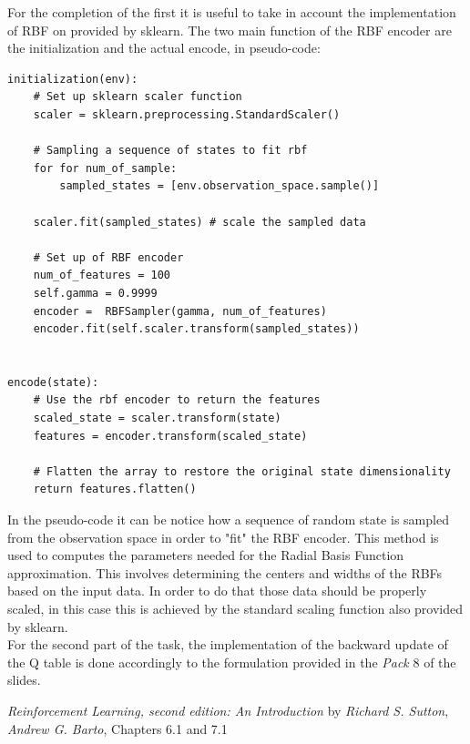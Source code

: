 \documentclass[10pt,a4paper]{article}
\begin{document}
\noindent For the completion of the first it is useful to take in account the implementation of RBF on provided by sklearn. The two main function of the RBF encoder are the initialization and the actual encode, in  pseudo-code:
\begin{lstlisting}
initialization(env):
    # Set up sklearn scaler function
    scaler = sklearn.preprocessing.StandardScaler()
    
    # Sampling a sequence of states to fit rbf
    for for num_of_sample:
        sampled_states = [env.observation_space.sample()]

    scaler.fit(sampled_states) # scale the sampled data

    # Set up of RBF encoder
    num_of_features = 100
    self.gamma = 0.9999
    encoder =  RBFSampler(gamma, num_of_features)
    encoder.fit(self.scaler.transform(sampled_states))
    

encode(state):
    # Use the rbf encoder to return the features
    scaled_state = scaler.transform(state)
    features = encoder.transform(scaled_state)

    # Flatten the array to restore the original state dimensionality
    return features.flatten() 
\end{lstlisting}

\noindent In the pseudo-code it can be notice how a sequence of random state is sampled from the observation space in order to "fit" the RBF encoder. This method is used to computes the parameters needed for the Radial Basis Function approximation. This involves determining the centers and widths of the RBFs based on the input data. In order to do that those data should be properly scaled, in this case this is achieved by the standard scaling function also provided by sklearn.\\

\noindent For the second part of the task, the implementation of the backward update of the Q table is done accordingly to the formulation provided in the \textit{Pack} 8 of the slides. 
\newpage

\begin{thebibliography}{9}
    \emph{Reinforcement Learning, second edition: An Introduction} by \textit{Richard S. Sutton}, \textit{Andrew G. Barto}, Chapters 6.1 and 7.1 

\end{thebibliography}
\end{document}
